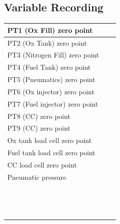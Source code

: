 \newpage
\subsection{Variable Recording}
\renewcommand{\arraystretch}{2}
\begin{tabular}{ | m{15em} | m{15em}| m{15em} |} 
    \hline
    PT1 (Ox Fill) zero point &  & \\
    \hline
    PT2 (Ox Tank) zero point & &  \\
    \hline
    PT3 (Nitrogen Fill) zero point & &  \\
    \hline
    PT4 (Fuel Tank) zero point & &   \\
    \hline
    PT5 (Pneumatics) zero point & &   \\
    \hline
    PT6 (Ox injector) zero point &  &  \\
    \hline
    PT7 (Fuel injector) zero point & & \\
    \hline
    PT8 (CC) zero point & & \\
    \hline
    PT9 (CC) zero point & &\\
    \hline
    Ox tank load cell zero point &  & \\
    \hline
    Fuel tank load cell zero point & &\\
    \hline
    CC load cell zero point &  & \\
    \hline
    Pneumatic pressure &  & \\
    \hline
     &  & \\
    \hline
& &  \\
    \hline

       &  & \\
    \hline
       &  & \\
    \hline
       &   & \\
    \hline
       & &  \\
    \hline
       & &  \\
    \hline
       & &  \\
    \hline
       & &  \\
    \hline
       &  & \\
    \hline
       &  & \\
    \hline
       &  & \\
    \hline
       & &  \\
    \hline
       &  & \\
    \hline

\end{tabular}



